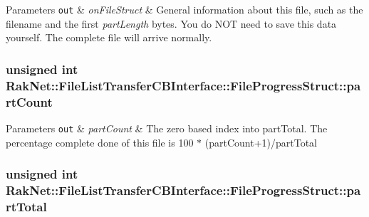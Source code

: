 \begin{DoxyParams}[1]{Parameters}
\mbox{\tt out}  & {\em on\-File\-Struct} & General information about this file, such as the filename and the first {\itshape part\-Length} bytes. You do N\-O\-T need to save this data yourself. The complete file will arrive normally. \\
\hline
\end{DoxyParams}
\hypertarget{struct_rak_net_1_1_file_list_transfer_c_b_interface_1_1_file_progress_struct_ae2fc4122e5a895c530c015882a41dcca}{
\subsubsection[{part\-Count}]{\setlength{\rightskip}{0pt plus 5cm}unsigned int Rak\-Net\-::\-File\-List\-Transfer\-C\-B\-Interface\-::\-File\-Progress\-Struct\-::part\-Count}}\label{struct_rak_net_1_1_file_list_transfer_c_b_interface_1_1_file_progress_struct_ae2fc4122e5a895c530c015882a41dcca}

\begin{DoxyParams}[1]{Parameters}
\mbox{\tt out}  & {\em part\-Count} & The zero based index into part\-Total. The percentage complete done of this file is 100 $\ast$ (part\-Count+1)/part\-Total \\
\hline
\end{DoxyParams}
\hypertarget{struct_rak_net_1_1_file_list_transfer_c_b_interface_1_1_file_progress_struct_abd81e27700d6b6b48cdc52a08890ce61}{
\subsubsection[{part\-Total}]{\setlength{\rightskip}{0pt plus 5cm}unsigned int Rak\-Net\-::\-File\-List\-Transfer\-C\-B\-Interface\-::\-File\-Progress\-Struct\-::part\-Total}}\label{struct_rak_net_1_1_file_list_transfer_c_b_interface_1_1_file_progress_struct_abd81e27700d6b6b48cdc52a08890ce61}

